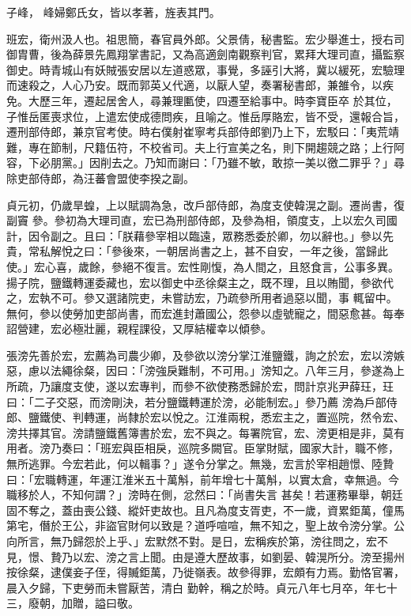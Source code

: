 \begin{pinyinscope}
 子峰，
 峰婦鄭氏女，皆以孝著，旌表其門。



 班宏，衛州汲人也。祖思簡，春官員外郎。父景倩，秘書監。宏少舉進士，授右司御胄曹，後為薛景先鳳翔掌書記，又為高適劍南觀察判官，累拜大理司直，攝監察御史。時青城山有妖賊張安居以左道惑眾，事覺，多誣引大將，冀以緩死，宏驗理而速殺之，人心乃安。既而郭英乂代適，以厭人望，奏署秘書郎，兼雒令，以疾免。大歷三年，遷起居舍人，尋兼理匭使，四遷至給事中。時李寶臣卒
 於其位，子惟岳匿喪求位，上遣宏使成德問疾，且喻之。惟岳厚賂宏，皆不受，還報合旨，遷刑部侍郎，兼京官考使。時右僕射崔寧考兵部侍郎劉乃上下，宏駁曰：「夷荒靖難，專在節制，尺籍伍符，不校省司。夫上行宣美之名，則下開趨競之路；上行阿容，下必朋黨。」因削去之。乃知而謝曰：「乃雖不敏，敢掠一美以徼二罪乎？」尋除吏部侍郎，為汪蕃會盟使李揆之副。



 貞元初，仍歲旱蝗，上以賦調為急，改戶部侍郎，為度支使韓滉之副。遷尚書，復副竇
 參。參初為大理司直，宏已為刑部侍郎，及參為相，領度支，上以宏久司國計，因令副之。且曰：「朕藉參宰相以臨遠，眾務悉委於卿，勿以辭也。」參以先貴，常私解悅之曰：「參後來，一朝居尚書之上，甚不自安，一年之後，當歸此使。」宏心喜，歲餘，參絕不復言。宏性剛愎，為人間之，且怒食言，公事多異。揚子院，鹽鐵轉運委藏也，宏以御史中丞徐粲主之，既不理，且以賄聞，參欲代之，宏執不可。參又選諸院吏，未嘗訪宏，乃疏參所用者過惡以聞，事
 輒留中。無何，參以使勞加吏部尚書，而宏進封蕭國公，怨參以虛號寵之，間惡愈甚。每奉詔營建，宏必極壯麗，親程課役，又厚結權幸以傾參。



 張滂先善於宏，宏薦為司農少卿，及參欲以滂分掌江淮鹽鐵，詢之於宏，宏以滂嫉惡，慮以法繩徐粲，因曰：「滂強戾難制，不可用。」滂知之。八年三月，參遂為上所疏，乃讓度支使，遂以宏專判，而參不欲使務悉歸於宏，問計京兆尹薛玨，玨曰：「二子交惡，而滂剛決，若分鹽鐵轉運於滂，必能制宏。」參乃薦
 滂為戶部侍郎、鹽鐵使、判轉運，尚隸於宏以悅之。江淮兩稅，悉宏主之，置巡院，然令宏、滂共擇其官。滂請鹽鐵舊簿書於宏，宏不與之。每署院官，宏、滂更相是非，莫有用者。滂乃奏曰：「班宏與臣相戾，巡院多闕官。臣掌財賦，國家大計，職不修，無所逃罪。今宏若此，何以輯事？」遂令分掌之。無幾，宏言於宰相趙憬、陸贄曰：「宏職轉運，年運江淮米五十萬斛，前年增七十萬斛，以實太倉，幸無過。今職移於人，不知何謂？」滂時在側，忿然曰：「尚書失言
 甚矣！若運務畢舉，朝廷固不奪之，蓋由喪公錢、縱奸吏故也。且凡為度支胥吏，不一歲，資累鉅萬，僮馬第宅，僭於王公，非盜官財何以致是？道呼喧喧，無不知之，聖上故令滂分掌。公向所言，無乃歸怨於上乎、」宏默然不對。是日，宏稱疾於第，滂往問之，宏不見，憬、贄乃以宏、滂之言上聞。由是遵大歷故事，如劉晏、韓滉所分。滂至揚州按徐粲，逮僕妾子侄，得贓鉅萬，乃徙嶺表。故參得罪，宏頗有力焉。勤恪官署，晨入夕歸，下吏勞而未嘗厭苦，清白
 勤幹，稱之於時。貞元八年七月卒，年七十三，廢朝，加贈，謚曰敬。




\end{pinyinscope}
